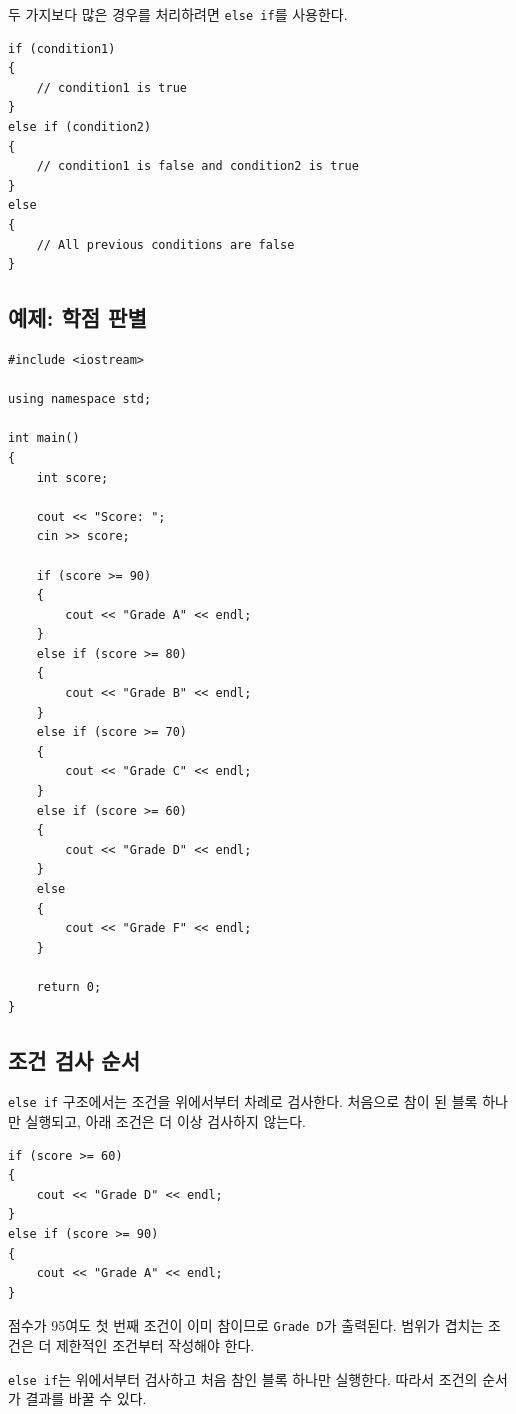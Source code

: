 \documentclass[11pt,a4paper]{article}
\begin{document}
두 가지보다 많은 경우를 처리하려면 \texttt{else if}를 사용한다.

\begin{lstlisting}
if (condition1)
{
    // condition1 is true
}
else if (condition2)
{
    // condition1 is false and condition2 is true
}
else
{
    // All previous conditions are false
}
\end{lstlisting}

\subsection{예제: 학점 판별}

\begin{lstlisting}
#include <iostream>

using namespace std;

int main()
{
    int score;

    cout << "Score: ";
    cin >> score;

    if (score >= 90)
    {
        cout << "Grade A" << endl;
    }
    else if (score >= 80)
    {
        cout << "Grade B" << endl;
    }
    else if (score >= 70)
    {
        cout << "Grade C" << endl;
    }
    else if (score >= 60)
    {
        cout << "Grade D" << endl;
    }
    else
    {
        cout << "Grade F" << endl;
    }

    return 0;
}
\end{lstlisting}

\subsection{조건 검사 순서}

\texttt{else if} 구조에서는 조건을 위에서부터 차례로 검사한다.
처음으로 참이 된 블록 하나만 실행되고, 아래 조건은 더 이상 검사하지 않는다.

\begin{lstlisting}
if (score >= 60)
{
    cout << "Grade D" << endl;
}
else if (score >= 90)
{
    cout << "Grade A" << endl;
}
\end{lstlisting}

점수가 95여도 첫 번째 조건이 이미 참이므로 \texttt{Grade D}가 출력된다.
범위가 겹치는 조건은 더 제한적인 조건부터 작성해야 한다.

\begin{importantbox}
\texttt{else if}는 위에서부터 검사하고 처음 참인 블록 하나만 실행한다.
따라서 조건의 순서가 결과를 바꿀 수 있다.
\end{importantbox}
\end{document}
